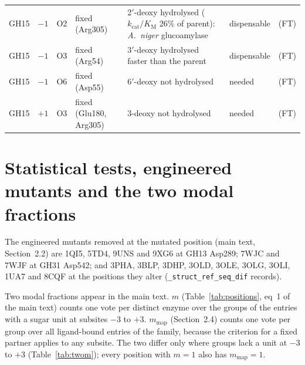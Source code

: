 \documentclass[preprint,12pt]{elsarticle}
\begin{document}
\begin{landscape}
{\begin{longtable}{lllp{3.3cm}p{6.8cm}lp{3.8cm}}
GH15 & $-1$ & O2 & fixed (Arg305) & 2$'$-deoxy hydrolysed ($k_\mathrm{cat}/K_\mathrm{M}$ 26\% of parent): \emph{A.~niger} glucoamylase & dispensable & \citep{Bock1987} (FT)\\
GH15 & $-1$ & O3 & fixed (Arg54) & 3$'$-deoxy hydrolysed faster than the parent & dispensable & \citep{Bock1987,Bock1988} (FT)\\
GH15 & $-1$ & O6 & fixed (Asp55) & 6$'$-deoxy not hydrolysed & needed & \citep{Bock1987} (FT)\\
GH15 & $+1$ & O3 & fixed (Glu180, Arg305) & 3-deoxy not hydrolysed & needed & \citep{Bock1987} (FT)\\
\end{longtable}}
\end{landscape}
\clearpage

\section{Statistical tests, engineered mutants and the two modal fractions}\label{sec:stats}
The engineered mutants removed at the mutated position (main text, Section~2.2) are 1QI5, 5TD4, 9UNS and 9XG6 at
GH13 Asp289; 7WJC and 7WJF at GH31 Asp542; and 3PHA, 3BLP, 3DHP, 3OLD, 3OLE, 3OLG, 3OLI, 1UA7 and 8CQF at the
positions they alter (\texttt{\_struct\_ref\_seq\_dif} records).

Two modal fractions appear in the main text. $m$ (Table~\ref{tab:positions}, eq~1 of the main text) counts one vote per distinct enzyme over the
groups of the entries with a sugar unit at subsites $-3$ to $+3$. $m_\mathrm{map}$ (Section~2.4) counts one
vote per group over all ligand-bound entries of the family, because the criterion for a fixed partner applies to
any subsite. The two differ only where groups lack a unit at $-3$ to $+3$ (Table~\ref{tab:twom}); every position with
$m = 1$ also has $m_\mathrm{map} = 1$.
\end{document}
